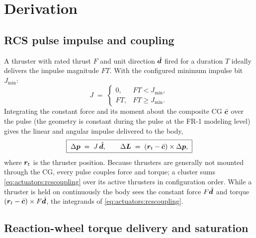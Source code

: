 \section{Derivation}
\label{sec:actuators:derivation}

\subsection{RCS pulse impulse and coupling}

A thruster with rated thrust $F$ and unit direction $\hat{\bm{d}}$
fired for a duration $T$ ideally delivers the impulse magnitude $F T$.
With the configured minimum impulse bit $J_{\min}$:
\begin{equation}
  J \;=\;
  \begin{cases}
    0, & F T < J_{\min}, \\
    F T, & F T \ge J_{\min}.
  \end{cases}
  \label{eq:actuators:mib}
\end{equation}
Integrating the constant force and its moment about the composite CG
$\bar{\bm{c}}$ over the pulse (the geometry is constant during the
pulse at the FR-1 modeling level) gives the linear and angular impulse
delivered to the body,
\begin{equation}
  \boxed{\; \Delta\bm{p} \;=\; J\, \hat{\bm{d}}, \qquad
  \Delta\bm{L} \;=\; (\bm{r}_t - \bar{\bm{c}}) \times \Delta\bm{p}, \;}
  \label{eq:actuators:rcscoupling}
\end{equation}
where $\bm{r}_t$ is the thruster position. Because thrusters are
generally not mounted through the CG, every pulse couples force and
torque; a cluster sums \eqref{eq:actuators:rcscoupling} over its
active thrusters in configuration order. While a thruster is held on
continuously the body sees the constant force $F \hat{\bm{d}}$ and
torque $(\bm{r}_t - \bar{\bm{c}}) \times F \hat{\bm{d}}$, the
integrands of \eqref{eq:actuators:rcscoupling}.

\subsection{Reaction-wheel torque delivery and saturation}

